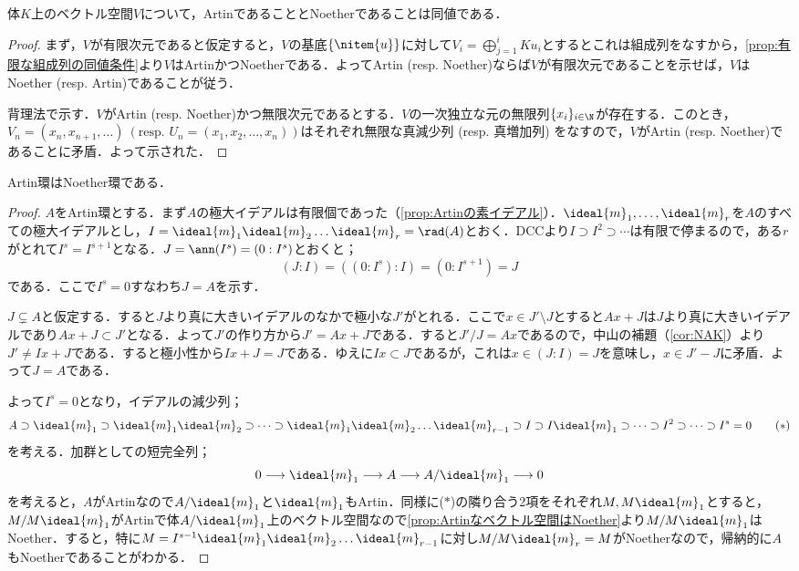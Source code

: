 \begin{prop}\label{prop:Artinなベクトル空間はNoether}
	体$K$上のベクトル空間$V$について，ArtinであることとNoetherであることは同値である．
\end{prop}
\begin{proof}
	まず，$V$が有限次元であると仮定すると，$V$の基底$\{\nitem{u}\}$に対して$V_i=\bigoplus_{j=1}^i Ku_i$とするとこれは組成列をなすから，\ref{prop:有限な組成列の同値条件}より$V$はArtinかつNoetherである．よってArtin (resp. Noether)ならば$V$が有限次元であることを示せば，$V$はNoether (resp. Artin)であることが従う．
	
	背理法で示す．$V$がArtin (resp. Noether)かつ無限次元であるとする．$V$の一次独立な元の無限列$\{x_i\}_{i\in\N}$が存在する．このとき，$V_n=(x_n,x_{n+1},\dots)~(\text{resp.~} U_n=(x_{1},x_{2},\dots,x_n))$はそれぞれ無限な真減少列 (resp. 真増加列) をなすので，$V$がArtin (resp. Noether)であることに矛盾．よって示された．
\end{proof}
\begin{thm}[秋月，1935]\label{thm:秋月}
	Artin環はNoether環である．
\end{thm}
\begin{proof}
	$A$をArtin環とする．まず$A$の極大イデアルは有限個であった（\ref{prop:Artinの素イデアル}）．$\ideal{m}_1,\dots,\ideal{m}_r$を$A$のすべての極大イデアルとし，$I= \ideal{m}_1\ideal{m}_2\dots \ideal{m}_r=\rad(A)$とおく．DCCより$I\supset I^2\supset\cdots$は有限で停まるので，ある$r$がとれて$I^s=I^{s+1}$となる．$J=\ann(I^s)=(0:I^s)$とおくと；
	\[(J:I)=((0:I^s):I)=(0:I^{s+1})=J\]
	である．ここで$I^s=0$すなわち$J=A$を示す．
	
	$J\subsetneq A$と仮定する．すると$J$より真に大きいイデアルのなかで極小な$J'$がとれる．ここで$x\in J'\setminus J$とすると$Ax+J$は$J$より真に大きいイデアルであり$Ax+J\subset J'$となる．よって$J'$の作り方から$J'=Ax+J$である．すると$J'/J=Ax$であるので，中山の補題（\ref{cor:NAK}）より$J'\neq Ix+J$である．すると極小性から$Ix+J=J$である．ゆえに$Ix\subset J$であるが，これは$x\in(J:I)=J$を意味し，$x\in J'-J$に矛盾．よって$J=A$である．
	
	よって$I^s=0$となり，イデアルの減少列；
	\[
	A\supset \ideal{m}_1\supset \ideal{m}_1 \ideal{m}_2\supset\dots\supset \ideal{m}_1 \ideal{m}_2\dots \ideal{m}_{r-1}\supset I\supset I \ideal{m}_1\supset\dots\supset I^2\supset\dots\supset I^s=0\tag{$\ast$}\]
	を考える．加群としての短完全列；
	\[0\longrightarrow \ideal{m}_1\longrightarrow A\longrightarrow A/ \ideal{m}_1\longrightarrow 0\]
	を考えると，$A$がArtinなので$A/ \ideal{m}_1$と$ \ideal{m}_1$もArtin．同様に($\ast$)の隣り合う2項をそれぞれ$M,M\ideal{m}_1$とすると，$M/M \ideal{m}_1$がArtinで体$A/ \ideal{m}_1$上のベクトル空間なので\ref{prop:Artinなベクトル空間はNoether}より$M/M \ideal{m}_1$はNoether．すると，特に$M=I^{s-1} \ideal{m}_1 \ideal{m}_2\dots \ideal{m}_{r-1}$に対し$M/M \ideal{m}_r=M$がNoetherなので，帰納的に$A$もNoetherであることがわかる．
\end{proof}

